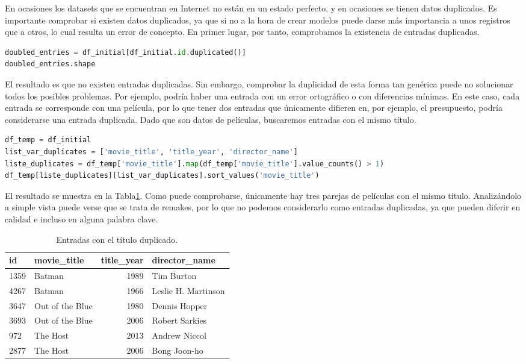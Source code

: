 En ocasiones los datasets que se encuentran en Internet no están en un estado perfecto, y en ocasiones se tienen datos duplicados. Es importante comprobar si existen datos duplicados, ya que si no a la hora de crear modelos puede darse más importancia a unos registros que a otros, lo cual resulta un error de concepto. En primer lugar, por tanto, comprobamos la existencia de entradas duplicadas.
\begin{lstlisting}[language=Python, caption=Entradas duplicadas]
doubled_entries = df_initial[df_initial.id.duplicated()]
doubled_entries.shape
\end{lstlisting}
El resultado es que no existen entradas duplicadas. Sin embargo, comprobar la duplicidad de esta forma tan genérica puede no solucionar todos los posibles problemas. Por ejemplo, podría haber una entrada con un error ortográfico o con diferencias mínimas. En este caso, cada entrada se corresponde con una película, por lo que tener dos entradas que únicamente difieren en, por ejemplo, el presupuesto, podría considerarse una entrada duplicada. Dado que son datos de películas, buscaremos entradas con el mismo título. 

\begin{lstlisting}[language=Python, caption=Entradas con título duplicado.]
df_temp = df_initial
list_var_duplicates = ['movie_title', 'title_year', 'director_name']
liste_duplicates = df_temp['movie_title'].map(df_temp['movie_title'].value_counts() > 1)
df_temp[liste_duplicates][list_var_duplicates].sort_values('movie_title')
\end{lstlisting}

El resultado se muestra en la Tabla\ref{tab:duplicated_entries}. Como puede comprobarse, únicamente hay tres parejas de películas con el mismo título. Analizándolo a simple vista puede verse que se trata de remakes, por lo que no podemos considerarlo como entradas duplicadas, ya que pueden diferir en calidad e incluso en alguna palabra clave.
\begin{table}[h]
\centering
\begin{tabular}{llrl}
\toprule
\textbf{id} &     \textbf{movie\_title} &  \textbf{title\_year} &        \textbf{director\_name} \\
\midrule
1359 &           Batman &      1989 &           Tim Burton \\
4267 &           Batman &      1966 &  Leslie H. Martinson \\
3647 &  Out of the Blue &      1980 &        Dennis Hopper \\
3693 &  Out of the Blue &      2006 &       Robert Sarkies \\
972  &         The Host &      2013 &        Andrew Niccol \\
2877 &         The Host &      2006 &         Bong Joon-ho \\
\bottomrule
\end{tabular}
\caption{Entradas con el título duplicado.}
\label{tab:duplicated_entries}
\end{table}

